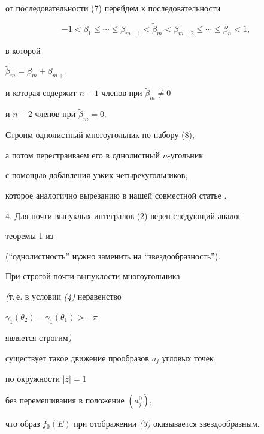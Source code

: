 от последовательности (7) перейдем к последовательности


\begin{equation}


-1 <\beta _{1}  \le \dotsb \le \beta _{m-1}


< \widetilde{\beta} _{m} <


\beta _{m+2}\le \dotsb \le \beta _{n}< 1,


\end{equation}




в которой


$\widetilde{\beta} _{m} =\beta _{m}+\beta _{m+1}$


и которая содержит $n-1$ членов при $\widetilde{\beta} _{m} \ne 0$


и $n-2$ членов при $\widetilde{\beta} _{m} =0$.


Строим однолистный многоугольник по набору (8),


а потом перестраиваем его в однолистный $n$-угольник


с помощью добавления узких четырехугольников,


которое аналогично вырезанию в нашей совместной статье \cite{Av}.





4. Для почти-выпуклых интегралов (2) верен следующий аналог


теоремы 1 из \cite{Av}


(``однолистность'' нужно заменить на ``звездообразность'').





\begin{thm}


При строгой почти-выпуклости многоугольника


{\em (}т.\,е. в условии {\em (4)} неравенство


$\gamma _{1} (\theta _{2})-\gamma _{1} (\theta _{1}) > -\pi $


является строгим{\em )}


существует такое движение прообразов $a_{j}$ угловых точек


по окружности $|z|=1$


без перемешивания в положение $( a_{j}^{0})$,


что образ $f _{0} (E)$ при отображении {\em (3)} оказывается звездообразным.


\end{thm}





